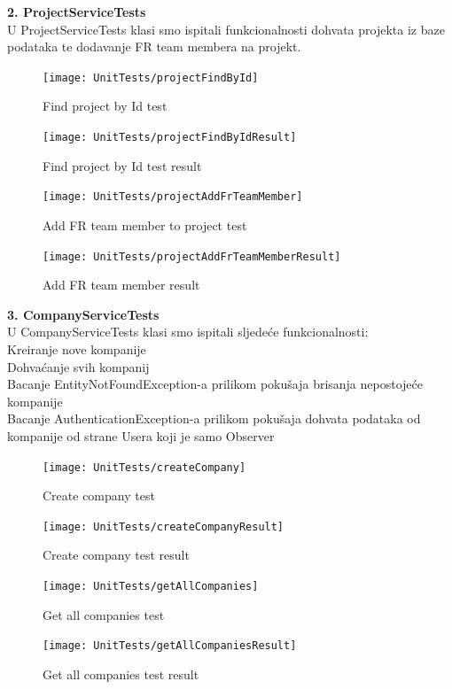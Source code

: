 			\textbf{2. ProjectServiceTests\\}
			{U ProjectServiceTests klasi smo ispitali funkcionalnosti dohvata projekta iz baze podataka te dodavanje FR team membera na projekt.}
			\begin{figure}[H]
				\texttt{[image: UnitTests/projectFindById]}
				\centering
				\caption{Find project by Id test}
				\label{fig:projectFindByIdTest}
			\end{figure}
			\begin{figure}[H]
				\texttt{[image: UnitTests/projectFindByIdResult]}
				\centering
				\caption{Find project by Id test result}
				\label{fig:projectFindByIdResult}
			\end{figure}

			\begin{figure}[H]
				\texttt{[image: UnitTests/projectAddFrTeamMember]}
				\centering
				\caption{Add FR team member to project test}
				\label{fig:addFrTeamMemberTest}
			\end{figure}
			\begin{figure}[H]
				\texttt{[image: UnitTests/projectAddFrTeamMemberResult]}
				\centering
				\caption{Add FR team member result}
				\label{fig:addFrTeamMemberResult}
			\end{figure}

			\textbf{3. CompanyServiceTests\\}
			{U CompanyServiceTests klasi smo ispitali sljedeće funkcionalnosti:\\
				Kreiranje nove kompanije\\
				Dohvaćanje svih kompanij\\
				Bacanje EntityNotFoundException-a prilikom pokušaja brisanja nepostojeće kompanije\\
				Bacanje AuthenticationException-a prilikom pokušaja dohvata podataka od kompanije od strane Usera koji je samo Observer}
			
			\begin{figure}[H]
				\texttt{[image: UnitTests/createCompany]}
				\centering
				\caption{Create company test}
				\label{fig:createCompanyTest}
			\end{figure}
			\begin{figure}[H]
				\texttt{[image: UnitTests/createCompanyResult]}
				\centering
				\caption{Create company test result}
				\label{fig:createCompanyResult}
			\end{figure}

			\begin{figure}[H]
				\texttt{[image: UnitTests/getAllCompanies]}
				\centering
				\caption{Get all companies test}
				\label{fig:getAllCompaniesTest}
			\end{figure}
			\begin{figure}[H]
				\texttt{[image: UnitTests/getAllCompaniesResult]}
				\centering
				\caption{Get all companies test result}
				\label{fig:getAllCompaniesResult}
			\end{figure}

